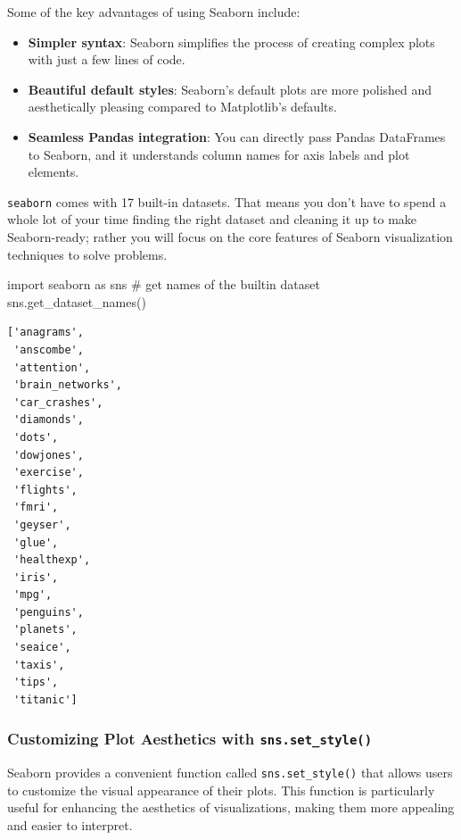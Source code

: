 \documentclass[
  letterpaper,
  DIV=11,
  numbers=noendperiod]{scrreprt}
\newenvironment{Shaded}{\begin{snugshade}}{\end{snugshade}}
\newcommand{\CommentTok}[1]{\textcolor[rgb]{0.37,0.37,0.37}{#1}}
\newcommand{\ImportTok}[1]{\textcolor[rgb]{0.00,0.46,0.62}{#1}}
\newcommand{\NormalTok}[1]{\textcolor[rgb]{0.00,0.23,0.31}{#1}}
\providecommand{\tightlist}{%
  \setlength{\itemsep}{0pt}\setlength{\parskip}{0pt}}\usepackage{longtable,booktabs,array}
\begin{document}
Some of the key advantages of using Seaborn include:

\begin{itemize}
\tightlist
\item
  \textbf{Simpler syntax}: Seaborn simplifies the process of creating
  complex plots with just a few lines of code.
\item
  \textbf{Beautiful default styles}: Seaborn's default plots are more
  polished and aesthetically pleasing compared to Matplotlib's defaults.
\item
  \textbf{Seamless Pandas integration}: You can directly pass Pandas
  DataFrames to Seaborn, and it understands column names for axis labels
  and plot elements.
\end{itemize}

\texttt{seaborn} comes with 17 built-in datasets. That means you don't
have to spend a whole lot of your time finding the right dataset and
cleaning it up to make Seaborn-ready; rather you will focus on the core
features of Seaborn visualization techniques to solve problems.

\begin{Shaded}
\begin{Highlighting}[]
\ImportTok{import}\NormalTok{ seaborn }\ImportTok{as}\NormalTok{ sns}
\CommentTok{\# get names of the builtin dataset}
\NormalTok{sns.get\_dataset\_names()}
\end{Highlighting}
\end{Shaded}

\begin{verbatim}
['anagrams',
 'anscombe',
 'attention',
 'brain_networks',
 'car_crashes',
 'diamonds',
 'dots',
 'dowjones',
 'exercise',
 'flights',
 'fmri',
 'geyser',
 'glue',
 'healthexp',
 'iris',
 'mpg',
 'penguins',
 'planets',
 'seaice',
 'taxis',
 'tips',
 'titanic']
\end{verbatim}

\hypertarget{customizing-plot-aesthetics-with-sns.set_style}{%
\subsubsection{\texorpdfstring{Customizing Plot Aesthetics with
\texttt{sns.set\_style()}}{Customizing Plot Aesthetics with sns.set\_style()}}\label{customizing-plot-aesthetics-with-sns.set_style}}

Seaborn provides a convenient function called \texttt{sns.set\_style()}
that allows users to customize the visual appearance of their plots.
This function is particularly useful for enhancing the aesthetics of
visualizations, making them more appealing and easier to interpret.
\end{document}
